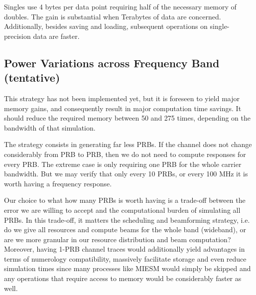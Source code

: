 Singles use 4 bytes per data point requiring half of the necessary memory of doubles. The gain is substantial when Terabytes of data are concerned. Additionally, besides saving and loading, subsequent operations on single-precision data are faster.


\subsection*{Power Variations across Frequency Band (tentative)}

This strategy has not been implemented yet, but it is foreseen to yield major memory gains, and consequently result in major computation time savings. It should reduce the required memory between 50 and 275 times, depending on the bandwidth of that simulation. 

The strategy consists in generating far less PRBs. If the channel does not change considerably from PRB to PRB, then we do not need to compute responses for every PRB. The extreme case is only requiring one PRB for the whole carrier bandwidth. But we may verify that only every 10 PRBs, or every 100 MHz it is worth having a frequency response.

Our choice to what how many PRBs is worth having is a trade-off between the error we are willing to accept and the computational burden of simulating all PRBs. In this trade-off, it matters the scheduling and beamforming strategy, i.e. do we give all resources and compute beams for the whole band (wideband), or are we more granular in our resource distribution and beam computation? Moreover, having 1-PRB channel traces would additionally yield advantages in terms of numerology compatibility, massively facilitate storage and even reduce simulation times since many processes like MIESM would simply be skipped and any operations that require access to memory would be considerably faster as well. 







